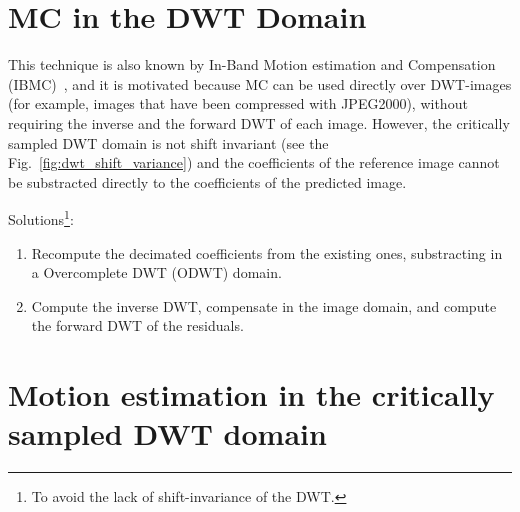 
\section{MC in the DWT Domain}

This technique is also known by In-Band Motion estimation and
Compensation (IBMC)~\cite{andreopoulos2005complete}, and it is
motivated because MC can be used directly over DWT-images (for
example, images that have been compressed with JPEG2000), without
requiring the inverse and the forward DWT of each image. However, the
critically sampled DWT domain is not shift invariant (see the
Fig.~\ref{fig:dwt_shift_variance}) and the coefficients of the
reference image cannot be substracted directly to the coefficients of
the predicted image.

Solutions\footnote{To avoid the lack of shift-invariance of the DWT.}:
\begin{enumerate}
\item Recompute the decimated coefficients from the existing ones,
  substracting in a Overcomplete DWT (ODWT) domain.
\item Compute the inverse DWT, compensate in the image domain, and
  compute the forward DWT of the residuals.
\end{enumerate}


\section{Motion estimation in the critically sampled DWT domain}

